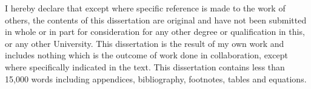 
\begin{declaration}

I hereby declare that except where specific reference is made to the work of others, the contents of this dissertation are original and have not been submitted in whole or in part for consideration for any other degree or qualification in this, or any other University. This dissertation is the result of my own work and includes nothing which is the outcome of work done in collaboration, except where specifically indicated in the text. This dissertation contains less than 15,000 words including appendices, bibliography, footnotes, tables and equations.%


\end{declaration}

